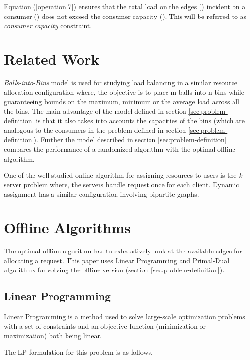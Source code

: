 \documentclass{llncs}
\begin{document}
Equation (\ref{operation 7}) ensures that the total load on the edges \big(\big) incident on a consumer () does not exceed the consumer capacity (). This will be referred to as \emph{consumer capacity} constraint.



\section{Related Work}
\emph{Balls-into-Bins} \cite{balls-to-bins-tight,klaus-thesis,balanced-alloc} model is used for studying load balancing in a similar resource allocation configuration where, the objective is to place m balls into n bins while guaranteeing bounds on the maximum, minimum or the average load across all the bins. The main advantage of the model defined in section \ref{sec:problem-definition} is that it also takes into accounts the capacities of the bins (which are analogous to the consumers in the problem defined in section \ref{sec:problem-definition}). Further the model described in section \ref{sec:problem-definition} compares the performance of a randomized algorithm with the optimal offline algorithm. 

One of the well studied online algorithm for assigning resources to users is the \emph{k}-server problem \cite{k-server-randomized} where, the servers handle request once for each client. Dynamic assignment \cite{dynamic-hungarian-algo} has a similar configuration involving bipartite graphs.

\section{Offline Algorithms}
\label{sec:offline}
The optimal offline algorithm has to exhaustively look at the available edges for allocating a request. This paper uses Linear Programming and Primal-Dual algorithms for solving the offline version (section \ref{sec:problem-definition}).

\subsection{Linear Programming}
\label{sec:offline-LP}
Linear Programming \cite{lp-onlline} is a method used to solve large-scale optimization problems with a set of constraints and an objective function (minimization or maximization) both being linear.

The LP formulation for this problem is as follows,
\end{document}
